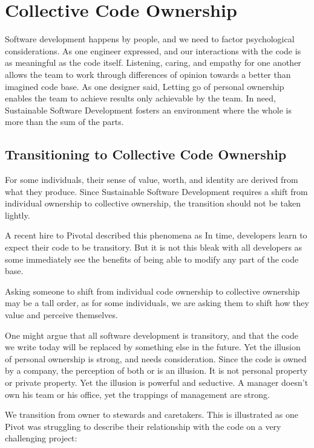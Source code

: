 \section{Collective Code Ownership}
\label{CollectiveCodeOwnership}
Software development happens by people, and we need to factor psychological considerations. As one engineer expressed,  and our interactions with the code is as meaningful as the code itself. Listening, caring, and empathy for one another allows the team to work through differences of opinion towards a better than imagined code base. As one designer said,  Letting go of personal ownership enables the team to achieve results only achievable by the team. In need, Sustainable Software Development fosters an environment where the whole is more than the sum of the parts. 

\subsection{Transitioning to Collective Code Ownership}
For some individuals, their sense of value, worth, and identity are derived from what they produce. Since Sustainable Software Development requires a shift from individual ownership to collective ownership, the transition should not be taken lightly. 

A recent hire to Pivotal described this phenomena as  In time, developers learn to expect their code to be transitory. But it is not this bleak with all developers as some immediately see the benefits of being able to modify any part of the code base.

Asking someone to shift from individual code ownership to collective ownership may be a tall order, as for some individuals, we are asking them to shift how they value and perceive themselves. 

One might argue that all software development is transitory, and that the code we write today will be replaced by something else in the future. Yet the illusion of personal ownership is strong, and needs consideration. Since the code is owned by a company, the perception of both  or  is an illusion. It is not personal property or private property. Yet the illusion is powerful and seductive. A manager doesn't own his team or his office, yet the trappings of management are strong.

We transition from owner to stewards and caretakers. This is illustrated as one Pivot was struggling to describe their relationship with the code on a very challenging project: 

